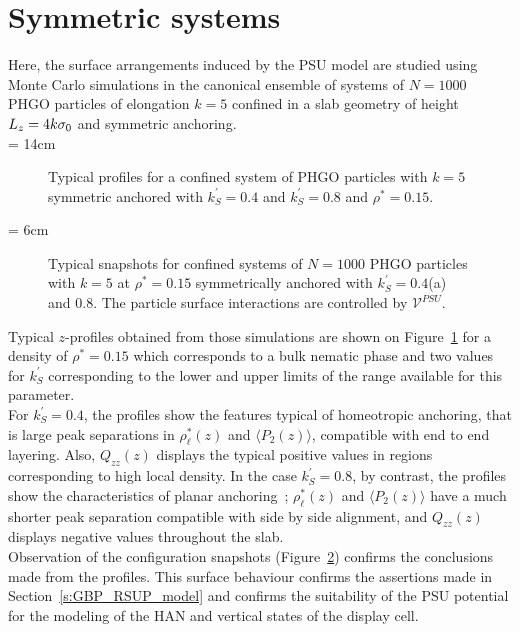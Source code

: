 

\section{Symmetric systems}
\label{s:GBP_RSUP_symmetric}

Here, the surface arrangements induced by the PSU model are studied using Monte Carlo simulations in
the canonical ensemble of systems of $N=1000$ PHGO particles of elongation $k=5$ confined in a slab
geometry of height $L_z=4k\sigma_0$ and symmetric anchoring.\\

\picW = 14cm
\begin{figure}
	\centering
	\caption{Typical profiles for a confined system of PHGO particles with $k=5$ symmetric
	anchored with $k^\prime_S = 0.4$ and $k^\prime_S = 0.8$ and $\rho^{*} = 0.15$.}
	\label{fig:GBP_RSUP_typeProf_d0.15}
\end{figure}

\picW = 6cm
\begin{figure}
	\centering
	\hspace*{5mm}
	\caption{Typical snapshots for confined systems of $N=1000$ PHGO particles
	with $k=5$ at $\rho^{*} = 0.15$ symmetrically anchored with $k^\prime_S = 0.4$(a) and
	$0.8$. The particle surface interactions are controlled by $\mathcal{V}^{PSU}$.}
	\label{fig:GBP_RSUP_typeSnaps}
\end{figure}


Typical $z$-profiles obtained from those simulations are shown on 
Figure~\ref{fig:GBP_RSUP_typeProf_d0.15}  for a density of $\rho^{*}=0.15$ which corresponds 
to a bulk nematic phase and two values for $k^\prime_S$ corresponding to the lower 
and upper limits of the range available for this parameter.\\
For $k^\prime_S = 0.4$, the profiles show the features typical of homeotropic anchoring, that is
large peak separations in $\rho^{*}_\ell(z)$ and $\langle P_2(z)\rangle$, compatible with end to 
end layering. Also,
$Q_{zz}(z)$ displays the typical positive values in regions corresponding to high local
density. In the case $k^\prime_S = 0.8$, by contrast, the profiles show the characteristics of planar
anchoring~; $\rho^{*}_\ell(z)$ and $\langle P_2(z)\rangle$ have a much shorter peak separation
compatible  with side by side alignment, and $Q_{zz}(z)$ displays negative values throughout the slab.\\
Observation of the configuration snapshots (\eg Figure~\ref{fig:GBP_RSUP_typeSnaps}) confirms
the conclusions made from the profiles.
This surface behaviour confirms the assertions made in Section~\ref{s:GBP_RSUP_model} and
confirms the suitability of the PSU potential for the modeling of the HAN and vertical states 
of the display cell.\\


